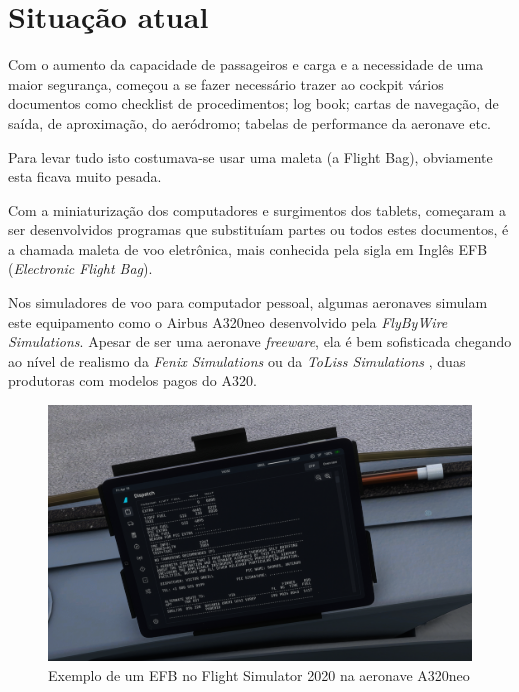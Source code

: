 \chapter{Situação atual}
Com o aumento da capacidade de passageiros e carga e a 
necessidade de uma maior 
segurança, começou a se fazer necessário trazer ao cockpit vários
documentos como checklist de procedimentos; log book; cartas de 
navegação, de saída, de aproximação, do aeródromo; tabelas de 
performance da aeronave etc. 

Para levar tudo isto costumava-se usar uma maleta (a Flight Bag),
obviamente esta ficava muito pesada.

Com a miniaturização dos computadores e surgimentos dos tablets, 
começaram a ser desenvolvidos programas que substituíam partes
ou todos estes documentos, é a chamada maleta de voo eletrônica,
mais conhecida pela sigla em Inglês EFB (\textit{Electronic Flight Bag}).

Nos simuladores de voo para computador pessoal, algumas aeronaves
simulam este equipamento como o Airbus A320neo desenvolvido pela
\textit{FlyByWire Simulations}.\cite{fly-by-wire-a320} Apesar de ser uma aeronave \textit{freeware}, ela 
é bem sofisticada chegando ao nível de realismo da \textit{Fenix Simulations} \cite{fenix-a320}
ou da \textit{ToLiss Simulations} \cite{toliss-a320}, duas produtoras com modelos pagos do A320.

\begin{figure}[ht]
    \begin{center}
    \includegraphics[width=400pt]{img/efb-a320.png}
    \caption{Exemplo de um EFB no Flight Simulator 2020 na aeronave A320neo}
    \label{fig:efb-a320}
    \end{center}
\end{figure}

